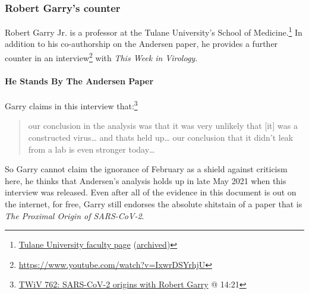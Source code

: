 \documentclass[11pt]{article}
\begin{document}
\subsubsection{Robert Garry's counter}
\label{sec:orgd6b1e1a}
Robert Garry Jr. is a professor at the Tulane University's School of Medicine.\footnote{\href{https://medicine.tulane.edu/departments/microbiology-immunology-tulane-cancer-center-tips-advisory-committee-tips-mentor/faculty}{Tulane University faculty page} (\href{https://archive.is/AfFRU}{archived})} In addition to his co-authorship on the Andersen paper, he provides a further counter in an interview\footnote{\url{https://www.youtube.com/watch?v=IxwrDSYrhjU}} with \emph{This Week in Virology}.

\paragraph{He Stands By The Andersen Paper}
\label{sec:orgd942e43}
Garry claims in this interview that:\footnote{\href{https://youtu.be/IxwrDSYrhjU?t=861}{TWiV 762: SARS-CoV-2 origins with Robert Garry} @ 14:21}
\begin{quote}
our conclusion in the analysis was that it was very unlikely that [it] was a constructed virus\ldots{} and thats held up\ldots{} our conclusion that it didn't leak from a lab is even stronger today\ldots{}
\end{quote}
So Garry cannot claim the ignorance of February as a shield against criticism here, he thinks that Andersen's analysis holds up in late May 2021 when this interview was released. Even after all of the evidence in this document is out on the internet, for free, Garry still endorses the absolute shitstain of a paper that is \emph{The Proximal Origin of SARS-CoV-2}.
\end{document}
